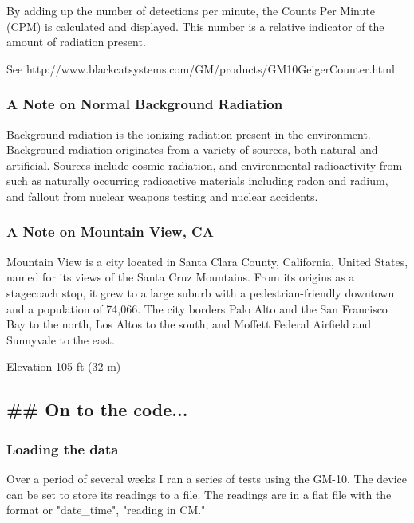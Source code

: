 \documentclass[11pt]{article}
\begin{document}
By adding up the number of detections per minute, the Counts Per Minute
(CPM) is calculated and displayed. This number is a relative indicator
of the amount of radiation present.

See http://www.blackcatsystems.com/GM/products/GM10GeigerCounter.html

\subsubsection{A Note on Normal Background
Radiation}\label{a-note-on-normal-background-radiation}

Background radiation is the ionizing radiation present in the
environment. Background radiation originates from a variety of sources,
both natural and artificial. Sources include cosmic radiation, and
environmental radioactivity from such as naturally occurring radioactive
materials including radon and radium, and fallout from nuclear weapons
testing and nuclear accidents.

\subsubsection{A Note on Mountain View,
CA}\label{a-note-on-mountain-view-ca}

Mountain View is a city located in Santa Clara County, California,
United States, named for its views of the Santa Cruz Mountains. From its
origins as a stagecoach stop, it grew to a large suburb with a
pedestrian-friendly downtown and a population of 74,066. The city
borders Palo Alto and the San Francisco Bay to the north, Los Altos to
the south, and Moffett Federal Airfield and Sunnyvale to the east.

Elevation 105 ft (32 m)

    \subsection{\#\# On to the code...}\label{on-to-the-code...}

    \subsubsection{Loading the data}\label{loading-the-data}

Over a period of several weeks I ran a series of tests using the GM-10.
The device can be set to store its readings to a file. The readings are
in a flat file with the format or "date\_time", "reading in CM."
\end{document}
